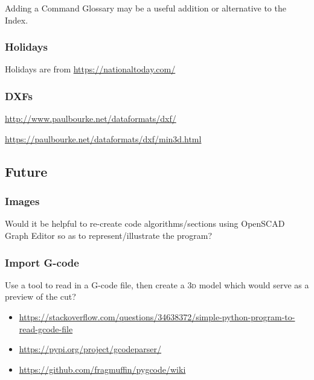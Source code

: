\documentclass{ltxdoc}
\begin{document}
Adding a Command Glossary may be a useful addition or alternative to the Index.

\subsubsection*{Holidays}

Holidays are from \url{https://nationaltoday.com/}

\subsubsection*{DXFs}

\url{http://www.paulbourke.net/dataformats/dxf/}

\noindent\url{https://paulbourke.net/dataformats/dxf/min3d.html}

\subsection*{Future}

\subsubsection*{Images}

Would it be helpful to re-create code algorithms/sections using OpenSCAD Graph Editor so as to represent/illustrate the program?

%

\subsubsection*{Import G-code}

Use a tool to read in a G-code file, then create a \textsc{3d} model which would serve as a preview of the cut?

\begin{itemize}
\item \url{https://stackoverflow.com/questions/34638372/simple-python-program-to-read-gcode-file}
\item \url{https://pypi.org/project/gcodeparser/}
\item \url{https://github.com/fragmuffin/pygcode/wiki}
\end{itemize} 
 
\end{document}
